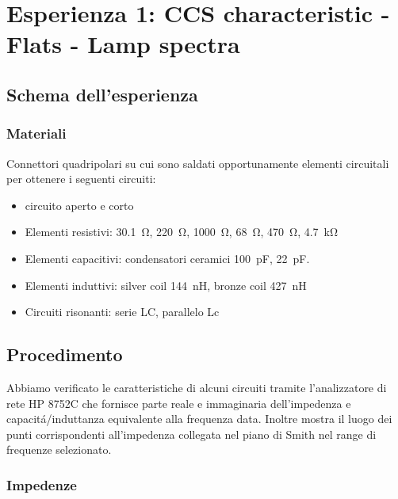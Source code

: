 \documentclass[main.tex]{subfiles}
\begin{document}

\chapter{Esperienza 1: CCS characteristic - Flats - Lamp spectra}

\section{Schema dell'esperienza}

\subsection{Materiali}

Connettori quadripolari su cui sono saldati opportunamente elementi circuitali per ottenere i seguenti circuiti:

\begin{itemize}
\item circuito aperto e corto
\item Elementi resistivi: \SI{30.1}{\ohm}, \SI{220}{\ohm}, \SI{1000}{\ohm}, \SI{68}{\ohm}, \SI{470}{\ohm}, \SI{4.7}{\kilo\ohm}
\item Elementi capacitivi: condensatori ceramici  \SI{100}{\pico\farad}, \SI{22}{\pico\farad}.
\item Elementi induttivi: silver coil \SI{144}{\nano\henry}, bronze coil \SI{427}{\nano\henry} 
\item Circuiti risonanti: serie LC, parallelo Lc
\end{itemize}

\section{Procedimento}

Abbiamo verificato le caratteristiche di alcuni circuiti tramite l'analizzatore di rete HP 8752C che fornisce parte reale e immaginaria dell'impedenza e capacit\'a/induttanza equivalente alla frequenza data. Inoltre mostra il luogo dei punti corrispondenti all'impedenza collegata nel piano di Smith nel range di frequenze selezionato.

\subsection{Impedenze}
\end{document}
